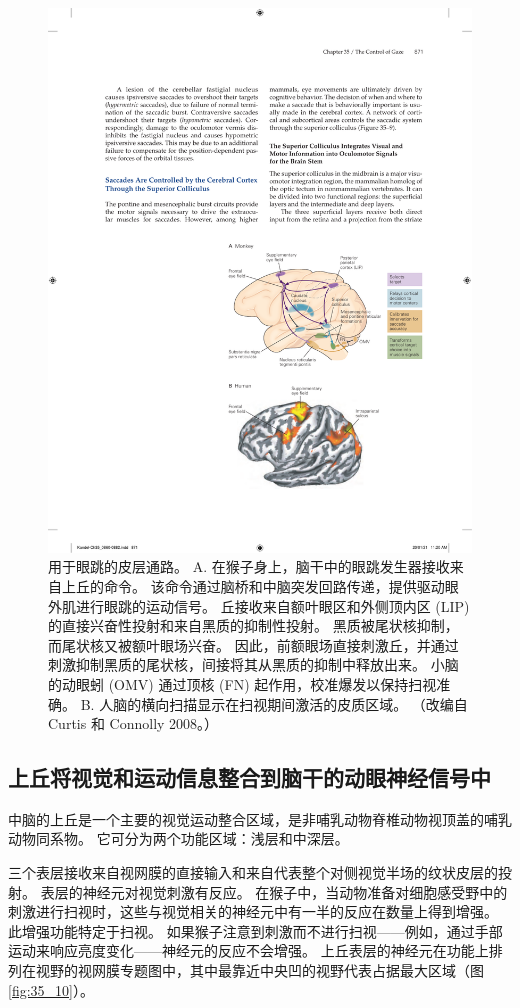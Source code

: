 \begin{figure}[htbp]
	\centering
	\includegraphics[width=0.6\linewidth]{chap35/fig_35_9}
	\caption{用于眼跳的皮层通路。 A. 在猴子身上，脑干中的眼跳发生器接收来自上丘的命令。 该命令通过脑桥和中脑突发回路传递，提供驱动眼外肌进行眼跳的运动信号。 丘接收来自额叶眼区和外侧顶内区 (LIP) 的直接兴奋性投射和来自黑质的抑制性投射。 黑质被尾状核抑制，而尾状核又被额叶眼场兴奋。 因此，前额眼场直接刺激丘，并通过刺激抑制黑质的尾状核，间接将其从黑质的抑制中释放出来。 小脑的动眼蚓 (OMV) 通过顶核 (FN) 起作用，校准爆发以保持扫视准确。 B. 人脑的横向扫描显示在扫视期间激活的皮质区域。 （改编自 Curtis 和 Connolly 2008。）}
	\label{fig:35_9}
\end{figure}


\subsection{上丘将视觉和运动信息整合到脑干的动眼神经信号中}

中脑的上丘是一个主要的视觉运动整合区域，是非哺乳动物脊椎动物视顶盖的哺乳动物同系物。
它可分为两个功能区域：浅层和中深层。


三个表层接收来自视网膜的直接输入和来自代表整个对侧视觉半场的纹状皮层的投射。
表层的神经元对视觉刺激有反应。
在猴子中，当动物准备对细胞感受野中的刺激进行扫视时，这些与视觉相关的神经元中有一半的反应在数量上得到增强。
此增强功能特定于扫视。
如果猴子注意到刺激而不进行扫视——例如，通过手部运动来响应亮度变化——神经元的反应不会增强。
上丘表层的神经元在功能上排列在视野的视网膜专题图中，其中最靠近中央凹的视野代表占据最大区域（图 \ref{fig:35_10}）。


